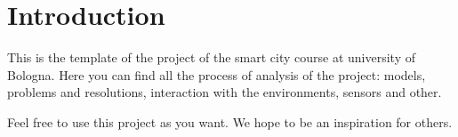 \section{Introduction}

This is the template of the project of the smart city course at university of Bologna. Here you can find all the process of analysis of the project: models, problems and resolutions, interaction with the environments, sensors and other.

Feel free to use this project as you want. We hope to be an inspiration for others.
